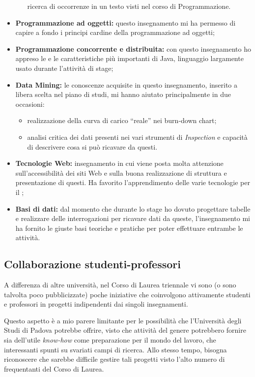 \begin{itemize}
\begin{itemize}
    ricerca di occorrenze in un testo visti nel corso di Programmazione.
  \end{itemize}
\item \textbf{Programmazione ad oggetti:} questo insegnamento mi ha permesso
  di capire a fondo i principi cardine della programmazione ad oggetti;
\item \textbf{Programmazione concorrente e distribuita:} con questo
  insegnamento ho appreso le  e le caratteristiche più
  importanti di Java, linguaggio largamente usato durante l'attività di stage;
\item \textbf{Data Mining:} le conoscenze acquisite in questo insegnamento,
  inserito a libera scelta nel piano di studi, mi hanno aiutato principalmente
  in due occasioni:
  \begin{itemize}
  \item realizzazione della curva di carico ``reale'' nei burn-down chart;
  \item analisi critica dei dati presenti nei vari strumenti di
    \emph{Inspection} e capacità di descrivere cosa si può ricavare da questi.
  \end{itemize}
\item \textbf{Tecnologie Web:} insegnamento in cui viene posta molta attenzione
  sull'accessibilità dei siti Web e sulla buona realizzazione di struttura e
  presentazione di questi. Ha favorito l'apprendimento delle varie tecnologie
  per il \FREND;
\item \textbf{Basi di dati:} dal momento che durante lo stage ho dovuto
  progettare tabelle e realizzare delle interrogazioni per ricavare dati da
  queste, l'insegnamento mi ha fornito le giuste basi teoriche e pratiche per
  poter effettuare entrambe le attività.
\end{itemize}

\subsection{Collaborazione studenti-professori}

A differenza di altre università, nel Corso di Laurea triennale vi sono (o
sono talvolta poco pubblicizzate) poche iniziative che coinvolgono attivamente
studenti e professori in progetti indipendenti dai singoli insegnamenti.

Questo aspetto è a mio parere limitante per le possibilità che l'Università
degli Studi di Padova potrebbe offrire, visto che attività del genere
potrebbero fornire sia dell'utile \emph{know-how} come preparazione per il
mondo del lavoro, che interessanti spunti su svariati campi di ricerca.
Allo stesso tempo, bisogna riconoscere che sarebbe difficile gestire tali
progetti visto l'alto numero di frequentanti del Corso di Laurea.

